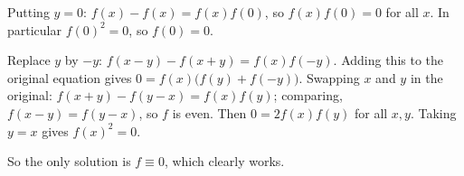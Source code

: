 Putting $y=0$: $f(x)-f(x)=f(x)f(0)$, so $f(x)f(0)=0$ for all $x$. In particular $f(0)^2=0$, so $f(0)=0$.

Replace $y$ by $-y$: $f(x-y)-f(x+y)=f(x)f(-y)$. Adding this to the original equation gives $0=f(x)\bigl(f(y)+f(-y)\bigr)$. Swapping $x$ and $y$ in the original: $f(x+y)-f(y-x)=f(x)f(y)$; comparing, $f(x-y)=f(y-x)$, so $f$ is even. Then $0=2f(x)f(y)$ for all $x,y$. Taking $y=x$ gives $f(x)^2=0$.

So the only solution is $\boxed{f\equiv0}$, which clearly works.
